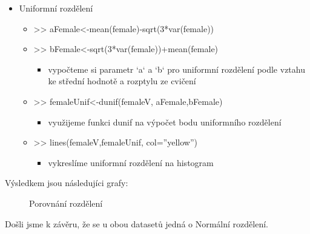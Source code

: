 \documentclass[paper=a4, fontsize=12pt]{scrartcl}
\numberwithin{equation}{section}		%
\numberwithin{figure}{section}			%
\numberwithin{table}{section}				%
\begin{document}
\begin{itemize}
\begin{itemize}
\begin{itemize}
		        \end{itemize}
		\item Uniformní rozdělení
			\begin{itemize}
		        \item >> aFemale<-mean(female)-sqrt(3*var(female))
		        \item >> bFemale<-sqrt(3*var(female))+mean(female)
		                \begin{itemize}
		                \item vypočteme si parametr `a` a `b` pro uniformní rozdělení podle vztahu ke střední hodnotě a rozptylu ze cvičení
		                \end{itemize}
		        \item >> femaleUnif<-dunif(femaleV, aFemale,bFemale)
		                \begin{itemize}
		                \item využijeme funkci dunif na výpočet bodu uniformního rozdělení
		                \end{itemize}
		        \item >> lines(femaleV,femaleUnif, col=''yellow'')
		                \begin{itemize}
		                \item vykreslíme uniformní rozdělení na histogram
		                \end{itemize}
		        \end{itemize}
		\end{itemize}
\end{itemize}
Výsledkem jsou následujíci grafy:%
\begin{figure}[H]%
    \centering
    \qquad
    \caption{Porovnání rozdělení}%
    \label{fig:example}%
\end{figure}
Došli jsme k závěru, že se u obou datasetů jedná o Normální rozdělení.
\end{document}
